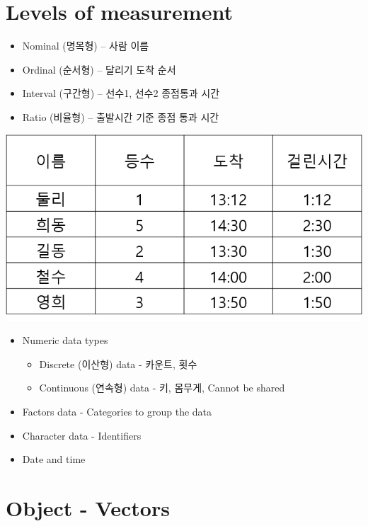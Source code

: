 \documentclass[
]{book}
\providecommand{\tightlist}{%
  \setlength{\itemsep}{0pt}\setlength{\parskip}{0pt}}
\begin{document}
\hypertarget{levels-of-measurement}{%
\section{Levels of measurement}\label{levels-of-measurement}}

\begin{itemize}
\tightlist
\item
  Nominal (명목형) -- 사람 이름
\item
  Ordinal (순서형) -- 달리기 도착 순서
\item
  Interval (구간형) -- 선수1, 선수2 종점통과 시간
\item
  Ratio (비율형) -- 출발시간 기준 종점 통과 시간
\end{itemize}

\includegraphics{images/02/01.png}

\begin{itemize}
\tightlist
\item
  Numeric data types

  \begin{itemize}
  \tightlist
  \item
    Discrete (이산형) data - 카운트, 횟수
  \item
    Continuous (연속형) data - 키, 몸무게, Cannot be shared
  \end{itemize}
\item
  Factors data - Categories to group the data
\item
  Character data - Identifiers
\item
  Date and time
\end{itemize}

\hypertarget{object---vectors}{%
\section{Object - Vectors}\label{object---vectors}}
\end{document}
